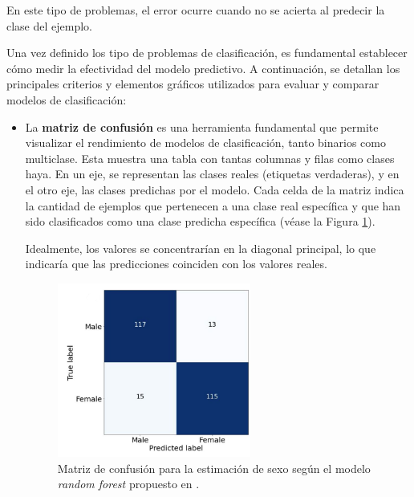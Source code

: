 En este tipo de problemas, el error ocurre cuando no se acierta al predecir la clase del ejemplo.



Una vez definido los tipo de problemas de clasificación, es fundamental establecer cómo medir la efectividad 
del modelo predictivo. A continuación, se detallan los principales criterios y elementos gráficos utilizados 
para evaluar y comparar modelos de clasificación:

\begin{itemize}
    
    \item La \textbf{matriz de confusión} es una herramienta fundamental que permite visualizar el rendimiento 
    de modelos de clasificación, tanto binarios como multiclase. Esta muestra una tabla con tantas columnas y 
    filas como clases haya. En un eje, se representan las clases reales (etiquetas verdaderas), y en el otro 
    eje, las clases predichas por el modelo. Cada celda de la matriz indica la cantidad de ejemplos que 
    pertenecen a una clase real específica y que han sido clasificados como una clase predicha específica 
    (véase la Figura \ref{fig:conf_matrix_binary}).

    Idealmente, los valores se concentrarían en la diagonal principal, lo que indicaría que las predicciones 
    coinciden con los valores reales.

    \begin{figure}[h]
        \centering
        \includegraphics[width=0.6\textwidth]{capitulos/cap_02/imagenes/confusion_matrix_binary.png}
        \caption{
            Matriz de confusión para la estimación de sexo según el modelo \textit{random forest} 
            propuesto en \cite{bidmos2023}.
        } 
        \label{fig:conf_matrix_binary}
    \end{figure}


\end{itemize}
